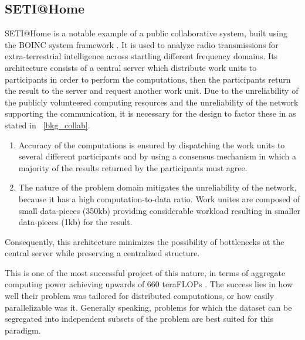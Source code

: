 \documentclass[12pt, titlepage]{uo_temp}
\begin{document}
     \subsection{SETI@Home}\label{bkg_seti}
     SETI@Home \cite{anderson2002seti} is a notable example of a public collaborative
     system, built using the BOINC system framework \cite{anderson2004boinc}.
     It is used to analyze radio transmissions for extra-terrestrial intelligence across
     startling different frequency domains.
     Its architecture consists of a central server which distribute work units to
     participants in order to perform the computations, then the participants return the
     result to the server and request another work unit.
     Due to the unreliability of the publicly volunteered computing resources and the
     unreliability of the network supporting the communication, it is necessary for the
     design to factor these in as stated in ~\ref{bkg_collab}. 
     \begin{enumerate}
     \item Accuracy of the computations is ensured by dispatching the work units to
     several different participants and by using a consensus mechanism in which a majority
     of the results returned by the participants must agree.
     \item The nature of the problem domain mitigates the unreliability of the network,
       because it has a high computation-to-data ratio. Work unites are composed of small
       data-pieces (350kb) providing considerable workload resulting in smaller
       data-pieces (1kb) for the result.
     \end{enumerate}
     Consequently, this architecture minimizes the possibility of bottlenecks at the central
     server while preserving a centralized structure. 
     
     This is one of the most successful project of this nature, in terms of aggregate
     computing power achieving upwards of 660 teraFLOPs \cite{wikiseti}. The success lies
     in how well their problem was tailored for distributed computations, or how easily
     parallelizable was it. Generally speaking, problems for which the dataset can be
     segregated into independent subsets of the problem are best suited for this
     paradigm.
\end{document}
